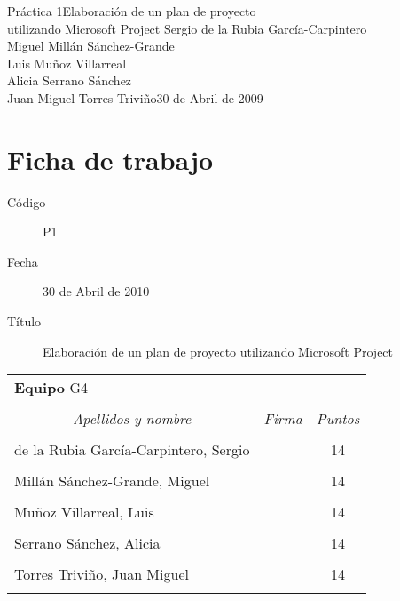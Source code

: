 \documentclass[11pt,a4paper,spanish,twoside]{report}
\begin{document}


{Práctica 1}{Elaboración de un plan de proyecto\\utilizando Microsoft Project}
{Sergio de la Rubia García-Carpintero\\Miguel Millán Sánchez-Grande\\
  Luis Muñoz Villarreal\\Alicia Serrano Sánchez\\
  Juan Miguel Torres Triviño}{30 de Abril de 2009}


\chapter*{Ficha de trabajo}
\begin{description}
\item[Código] P1
\item[Fecha] 30 de Abril de 2010
\item[Título] Elaboración de un plan de proyecto utilizando Microsoft Project
\end{description}

\begin{table}[!ht]
  \centering
  \begin{tabular}{lp{5cm}c}
    \multicolumn{3}{l}{\Large \textbf{Equipo} G4} \\ \\
    \multicolumn{1}{c}{\emph{Apellidos y nombre}} & 
    \multicolumn{1}{c}{\emph{Firma}} & \emph{Puntos} \\
    \hline \\
    de la Rubia García-Carpintero, Sergio & & 14 \\ \\
    Millán Sánchez-Grande, Miguel         & & 14 \\ \\
    Muñoz Villarreal, Luis                & & 14 \\ \\
    Serrano Sánchez, Alicia               & & 14 \\ \\
    Torres Triviño, Juan Miguel           & & 14 \\ \\
    \hline
  \end{tabular}
\end{table}
\end{document}
